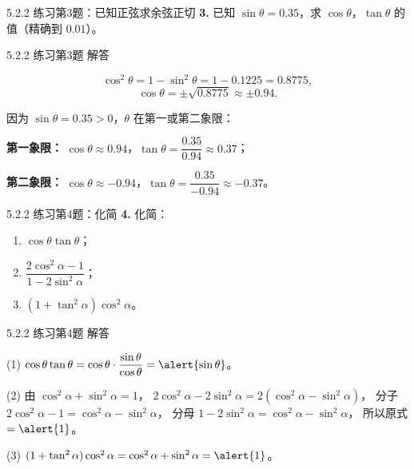 \documentclass[10pt,aspectratio=169,serif]{beamer}
\begin{document}
\begin{frame}[t]{5.2.2 练习第3题：已知正弦求余弦正切}
\textbf{3.} 已知 $\sin\theta=0.35$，求 $\cos\theta$，$\tan\theta$ 的值（精确到 $0.01$）。
\end{frame}

\begin{frame}[t]{5.2.2 练习第3题 解答}
\begin{tcolorbox}[colback=orange!10,colframe=orange,title=\textbf{解}]
\[
\cos^2\theta = 1-\sin^2\theta = 1-0.1225 = 0.8775,
\]
\[
\cos\theta = \pm\sqrt{0.8775}\approx\pm 0.94.
\]

\vspace{0.5em}
因为 $\sin\theta=0.35>0$，$\theta$ 在第一或第二象限：

\vspace{0.3em}
\textbf{第一象限：} $\cos\theta\approx 0.94$，$\tan\theta=\dfrac{0.35}{0.94}\approx 0.37$；

\textbf{第二象限：} $\cos\theta\approx -0.94$，$\tan\theta=\dfrac{0.35}{-0.94}\approx -0.37$。
\end{tcolorbox}
\end{frame}

\begin{frame}[t]{5.2.2 练习第4题：化简}
\textbf{4.} 化简：
\begin{enumerate}
  \item $\cos\theta\tan\theta$；
  \item $\dfrac{2\cos^2\alpha-1}{1-2\sin^2\alpha}$；
  \item $(1+\tan^2\alpha)\cos^2\alpha$。
\end{enumerate}
\end{frame}

\begin{frame}[t]{5.2.2 练习第4题 解答}
\begin{tcolorbox}[colback=orange!10,colframe=orange,title=\textbf{解}]
(1) $\cos\theta\tan\theta = \cos\theta\cdot\dfrac{\sin\theta}{\cos\theta} = \alert{\sin\theta}$。

(2) 由 $\cos^2\alpha+\sin^2\alpha=1$，
$2\cos^2\alpha-2\sin^2\alpha = 2(\cos^2\alpha-\sin^2\alpha)$，
分子 $2\cos^2\alpha-1=\cos^2\alpha-\sin^2\alpha$，
分母 $1-2\sin^2\alpha=\cos^2\alpha-\sin^2\alpha$，
所以原式 $=\alert{1}$。

(3) $(1+\tan^2\alpha)\cos^2\alpha = \cos^2\alpha+\sin^2\alpha = \alert{1}$。
\end{tcolorbox}
\end{frame}
\end{document}
